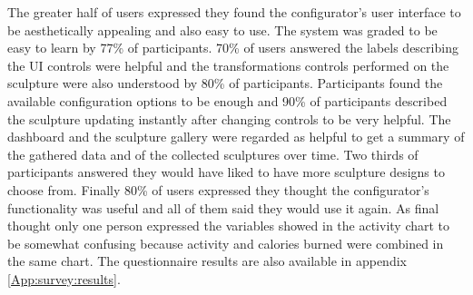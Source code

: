 \documentclass[../medieninformatik-arbeit.tex]{subfiles}
\begin{document}
The greater half of users expressed they found the configurator's user interface to be aesthetically appealing and also easy to use. The system was graded to be easy to learn by 77\% of participants. 70\% of users answered the labels describing the UI controls were helpful and the transformations controls performed on the sculpture were also understood by 80\% of participants. Participants found the available configuration options to be enough and 90\% of participants described the sculpture updating instantly after changing controls to be very helpful. The dashboard and the sculpture gallery were regarded as helpful to get a summary of the gathered data and of the collected sculptures over time. Two thirds of participants answered they would have liked to have more sculpture designs to choose from.
Finally 80\% of users expressed they thought the configurator's functionality was useful and all of them said they would use it again. As final thought only one person expressed the variables showed in the activity chart to be somewhat confusing because activity and calories burned were combined in the same chart. The questionnaire results are also available in appendix \ref{App:survey:results}.
\end{document}
